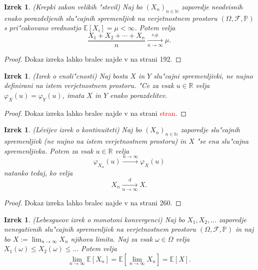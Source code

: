 \documentclass[12pt, a4paper, reqno]{amsart}
\theoremstyle{definition}
\theoremstyle{plain}
\newtheorem{izrek}[definicija]{Izrek}
\newcommand{\R}{\mathbb{R}}
\newcommand{\N}{\mathbb{N}}
\newcommand{\E}{\mathbb{E}}
\newcommand{\Prob}{\mathbb{P}}
\newcommand{\1}{\mathds{1}}
\begin{document}
    \begin{izrek}(Krepki zakon velikih "stevil)
        Naj bo $(X_n)_{n\in\N}$ zaporedje neodvisnih enako porazdeljenih
        slu"cajnih spremenljivk na verjetnostnem prostoru $(\Omega, \mathcal{F}, \Prob)$
         s pri"cakovano vrednostjo $\E\left[X_i\right] = \mu <\infty$. Potem velja
        \begin{equation*}
            \frac{X_1 + X_2 + \cdots + X_n}{n}\xrightarrow[n\to\infty]{s.g.} \mu.
        \end{equation*}
        \label{izr:KrepkiZakonVelikihStevil}
    \end{izrek}

    \begin{proof}
        Dokaz izreka lahko bralec najde v \cite{7} na strani 192.
    \end{proof}

    \begin{izrek}(Izrek o enoli"cnosti)
        Naj bosta $X$ in $Y$ slu"cajni spremenljivki, ne nujno definirani na istem verjetnostnem prostoru.
        "Ce za vsak $u\in\R$ velja $\varphi_X(u) = \varphi_Y(u)$, imata $X$ in $Y$ enako porazdelitev.
        \label{izr:enolicnost}
    \end{izrek}

    \begin{proof}
        Dokaz izreka lahko bralec najde v \cite{7} na strani \textcolor{red}{stran}.
    \end{proof}

    \begin{izrek}(Lévijev izrek o kontinuiteti)
        Naj bo $(X_n)_{n\in\N}$ zaporedje slu"cajnih spremenljivk (ne nujno na istem verjetnostnem prostoru)
        in $X$ "se ena slu"cajna spremenljivka. Potem za vsak $u\in\R$ velja
        \begin{equation*}
            \varphi_{X_n}(u) \xrightarrow{n\to\infty} \varphi_X(u) 
        \end{equation*}
        natanko tedaj, ko velja
        \begin{equation*}
            X_n \xrightarrow[n\to\infty]{d} X.
        \end{equation*}
        \label{izr:LevijevIzrek}
    \end{izrek}

    \begin{proof}
        Dokaz izreka lahko bralec najde v \cite{7} na strani 260.
    \end{proof}

    \begin{izrek}(Lebesgueov izrek o monotoni konvergenci)
        Naj bo $X_1, X_2, \dots $ zaporedje nenegativnih slu"cajnih spremenljivk na 
        verjetnostnem prostoru $(\Omega, \mathcal{F}, \Prob)$ in naj bo $X:= \lim_{n\to\infty}X_n$ 
        njihova limita. Naj za vsak $\omega \in \Omega$
        velja $X_1(\omega) \leq X_2(\omega) \leq \dots$ Potem velja 
        \begin{equation*}
            \lim_{n\to\infty}\E\left[X_n\right] = \E\left[\lim_{n\to\infty}X_n\right] = \E\left[X\right].
        \end{equation*}
        \label{izr:monotonaKonvergenca}
    \end{izrek}
\end{document}
